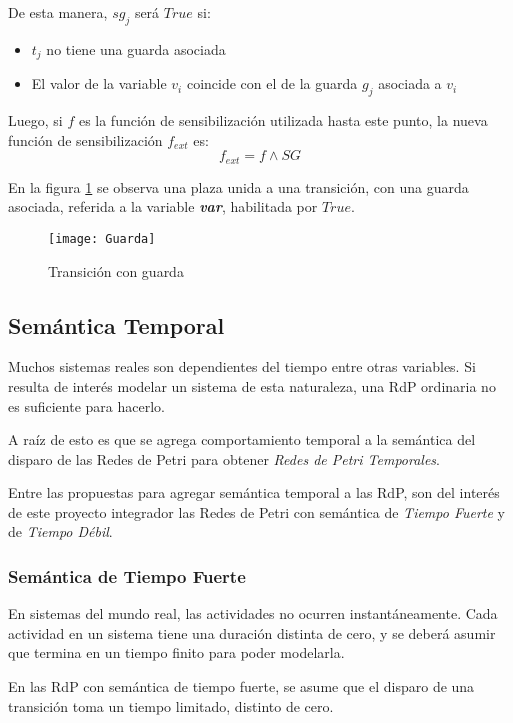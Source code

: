De esta manera, $sg_{j}$ será $True$ si:
\begin{itemize}
  \item $t_{j}$ no tiene una guarda asociada
  \item El valor de la variable $v_{i}$ coincide con el de la guarda $g_{j}$
  asociada a $v_{i}$
\end{itemize}

Luego, si $f$ es la función de sensibilización utilizada hasta este punto, la
nueva función de sensibilización $f_{ext}$ es:
$$ f_{ext} = f \land SG $$

En la figura \ref{fig:guarda} se observa una plaza unida a una transición,
con una guarda asociada, referida a la variable \textit{\textbf{var}},
habilitada por $True$.

\begin{figure}[h]
  \centering
  \texttt{[image: Guarda]}
  \caption{Transición con guarda}
  \label{fig:guarda}
\end{figure}

\subsection{Semántica Temporal}

Muchos sistemas reales son dependientes del tiempo entre otras variables. Si
resulta de interés modelar un sistema de esta naturaleza, una RdP ordinaria no
es suficiente para hacerlo.

A raíz de esto es que se agrega comportamiento temporal a la semántica del
disparo de las Redes de Petri para obtener \textit{Redes de Petri Temporales}.

Entre las propuestas para agregar semántica temporal a las RdP, son del interés
de este proyecto integrador las Redes de Petri con semántica de \textit{Tiempo
Fuerte} y de \textit{Tiempo Débil}.

\subsubsection{Semántica de Tiempo Fuerte}

En sistemas del mundo real, las actividades no ocurren instantáneamente. Cada
actividad en un sistema tiene una duración distinta de cero, y se deberá asumir
que termina en un tiempo finito para poder modelarla.
\cite{Ramchandani:1974:AAC:889750}

En las RdP con semántica de tiempo fuerte, se asume que el disparo de una
transición toma un tiempo limitado, distinto de cero.


